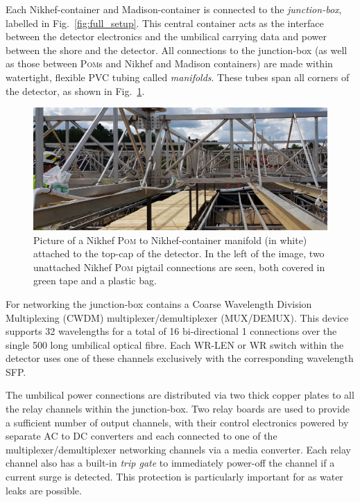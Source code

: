 Each Nikhef-container and Madison-container is connected to the \chipsfive \emph{junction-box},
labelled in Fig.~\ref{fig:full_setup}. This central container acts as the interface between the
detector electronics and the umbilical carrying data and power between the shore and the detector.
All connections to the junction-box (as well as those between \textsc{Pom}s and Nikhef and Madison
containers) are made within watertight, flexible PVC tubing called \emph{manifolds}. These tubes
span all corners of the \chipsfive detector, as shown in Fig.~\ref{fig:manifold}.

\begin{figure} %
    \includegraphics[width=\textwidth]{diagrams/5-daq/manifold.pdf}
    \caption[manifold short]
    {Picture of a Nikhef \textsc{Pom} to Nikhef-container manifold (in white) attached to the top-cap of
        the \chipsfive detector. In the left of the image, two unattached Nikhef \textsc{Pom} pigtail
        connections are seen, both covered in green tape and a plastic bag.}
    \label{fig:manifold}
\end{figure}

For networking the junction-box contains a Coarse Wavelength Division Multiplexing (CWDM)
multiplexer/demultiplexer (MUX/DEMUX). This device supports 32 wavelengths for a total of 16
bi-directional \unit{1}{} connections over the single \unit{500}{} long
umbilical optical fibre. Each WR-LEN or WR switch within the detector uses one of these channels
exclusively with the corresponding wavelength SFP.

The umbilical power connections are distributed via two thick copper plates to all the relay
channels within the junction-box. Two relay boards are used to provide a sufficient number of
output channels, with their control electronics powered by separate AC to DC converters and each
connected to one of the multiplexer/demultiplexer networking channels via a media converter. Each
relay channel also has a built-in \emph{trip gate} to immediately power-off the channel if a
current surge is detected. This protection is particularly important for \chips as water leaks are
possible.

